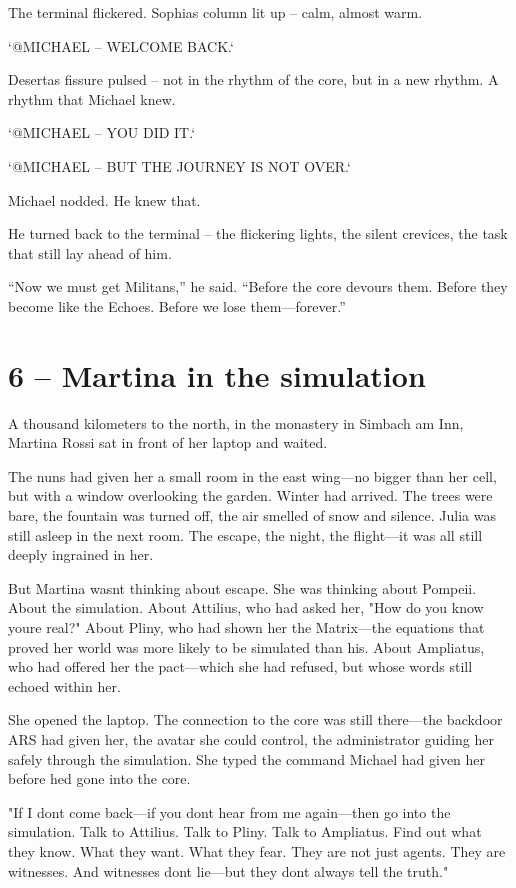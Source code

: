 \documentclass[
]{article}
\begin{document}
The terminal flickered. Sophia\textquotesingle s column lit up -- calm, almost warm.

`@MICHAEL -- WELCOME BACK.`

Deserta\textquotesingle s fissure pulsed -- not in the rhythm of the core, but in a new rhythm. A rhythm that Michael knew.

`@MICHAEL -- YOU DID IT.`

`@MICHAEL -- BUT THE JOURNEY IS NOT OVER.`

Michael nodded. He knew that.

He turned back to the terminal -- the flickering lights, the silent crevices, the task that still lay ahead of him.

``Now we must get Militans,'' he said. ``Before the core devours them. Before they become like the Echoes. Before we lose them---forever.''

\section{6 -- Martina in the simulation}\label{martina-in-the-simulation}

A thousand kilometers to the north, in the monastery in Simbach am Inn, Martina Rossi sat in front of her laptop and waited.

The nuns had given her a small room in the east wing---no bigger than her cell, but with a window overlooking the garden. Winter had arrived. The trees were bare, the fountain was turned off, the air smelled of snow and silence. Julia was still asleep in the next room. The escape, the night, the flight---it was all still deeply ingrained in her.

But Martina wasn\textquotesingle t thinking about escape. She was thinking about Pompeii. About the simulation. About Attilius, who had asked her, "How do you know you\textquotesingle re real?" About Pliny, who had shown her the Matrix---the equations that proved her world was more likely to be simulated than his. About Ampliatus, who had offered her the pact---which she had refused, but whose words still echoed within her.

She opened the laptop. The connection to the core was still there---the backdoor ARS had given her, the avatar she could control, the administrator guiding her safely through the simulation. She typed the command Michael had given her before he\textquotesingle d gone into the core.

"If I don\textquotesingle t come back---if you don\textquotesingle t hear from me again---then go into the simulation. Talk to Attilius. Talk to Pliny. Talk to Ampliatus. Find out what they know. What they want. What they fear. They are not just agents. They are witnesses. And witnesses don\textquotesingle t lie---but they don\textquotesingle t always tell the truth."
\end{document}
